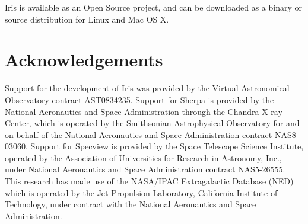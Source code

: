 \documentclass[final,5p]{elsarticle}
\begin{document}
Iris is available as an Open Source project, and can be downloaded as a binary or source distribution for Linux and Mac OS X.


\section*{Acknowledgements}
Support for the development of Iris was provided
by the Virtual Astronomical Observatory contract AST0834235. Support for Sherpa is
provided by the National Aeronautics and Space Administration through the Chandra
X-ray Center, which is operated by the Smithsonian Astrophysical Observatory for
and on behalf of the National Aeronautics and Space Administration contract NAS8-
03060. Support for Specview is provided by the Space Telescope Science Institute,
operated by the Association of Universities for Research in Astronomy, Inc., under
National Aeronautics and Space Administration contract NAS5-26555. This research
has made use of the NASA/IPAC Extragalactic Database (NED) which is operated by
the Jet Propulsion Laboratory, California Institute of Technology, under contract with
the National Aeronautics and Space Administration.


\end{document}
